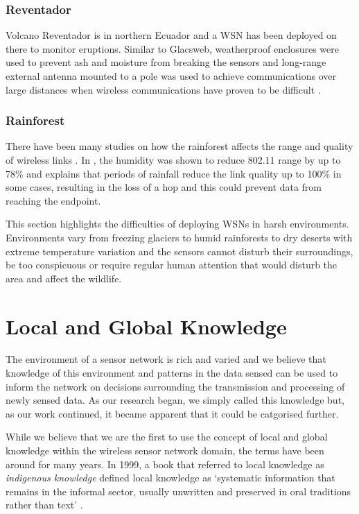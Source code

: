 	\subsubsection{Reventador}
	Volcano Reventador is in northern Ecuador and a WSN has been deployed on there to monitor eruptions. Similar to Glacsweb, weatherproof enclosures were used to prevent ash and moisture from breaking the sensors and long-range external antenna mounted to a pole was used to achieve communications over large distances when wireless communications have proven to be difficult \cite{Werner-Allen2006}.
	\subsubsection{Rainforest}
	There have been many studies on how the rainforest affects the range and quality of wireless links \cite{Figueiredo2009, Wark2008, Rahman2008}. In \cite{Figueiredo2009}, the humidity was shown to reduce 802.11 range by up to 78\% and \cite{Wark2008} explains that periods of rainfall reduce the link quality up to 100\% in some cases, resulting in the loss of a hop and this could prevent data from reaching the endpoint.


This section highlights the difficulties of deploying WSNs in harsh environments. Environments vary from freezing glaciers to humid rainforests to dry deserts with extreme temperature variation and the sensors cannot disturb their surroundings, be too conspicuous or require regular human attention that would disturb the area and affect the wildlife. 

\section{Local and Global Knowledge} \label{bg:lgk}
	The environment of a sensor network is rich and varied and we believe that knowledge of this environment and patterns in the data sensed can be used to inform the network on decisions surrounding the transmission and processing of newly sensed data. As our research began, we simply called this knowledge but, as our work continued, it became apparent that it could be catgorised further.

While we believe that we are the first to use the concept of local and global knowledge within the wireless sensor network domain, the terms have been around for many years. In 1999, a book that referred to local knowledge as \textit{indigenous knowledge} defined local knowledge as ‘systematic information that remains in the informal sector, usually unwritten and preserved in oral traditions rather than text’ \cite{LadislausM.Semali}. 

